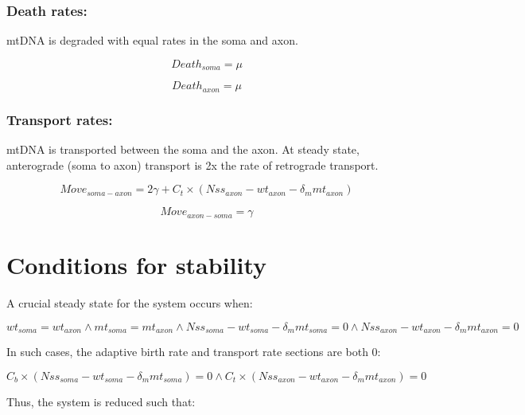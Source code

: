 \documentclass[]{article}
\begin{document}
	\subsubsection{Death rates:}
	
	mtDNA is degraded with equal rates in the soma and axon. 
	
	\begin{equation}
		Death_{soma} = \mu
	\end{equation}
	
	\begin{equation}
		Death_{axon} = \mu
	\end{equation}
	
	\subsubsection{Transport rates:}
	
	mtDNA is transported between the soma and the axon. At steady state, anterograde (soma to axon) transport is 2x the rate of retrograde transport. 
	
	\begin{equation}
		Move_{soma-axon} = 2\gamma + C_t \times (Nss_{axon}-wt_{axon}-\delta_m mt_{axon}) 
	\end{equation}
	
	\begin{equation}
		Move_{axon-soma} = \gamma
	\end{equation}

\section{Conditions for stability}
	
	A crucial steady state for the system occurs when:
	
	\begin{equation}
		wt_{soma} = wt_{axon} \land mt_{soma} = mt_{axon} \land Nss_{soma}-wt_{soma}-\delta_m mt_{soma} = 0 \land Nss_{axon}-wt_{axon}-\delta_m mt_{axon} = 0
	\end{equation}
	
	In such cases, the adaptive birth rate and transport rate sections are both 0:
	
	\begin{equation}
		C_b \times (Nss_{soma}-wt_{soma}-\delta_m mt_{soma}) = 0 \land C_t \times (Nss_{axon}-wt_{axon}-\delta_m mt_{axon}) = 0
	\end{equation}
	
	Thus, the system is reduced such that:
	
\end{document}
